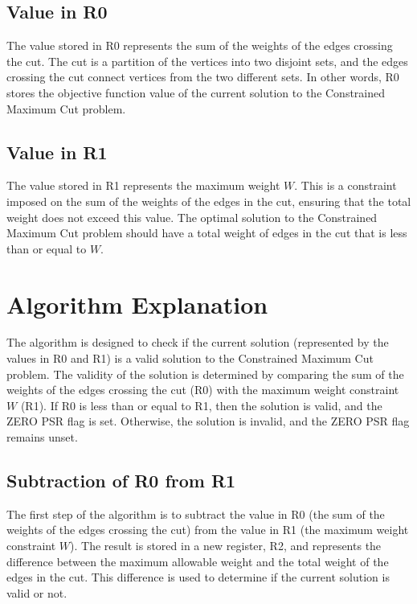 \subsection{Value in R0}

The value stored in R0 represents the sum of the weights of the edges crossing the cut. The cut is a partition of the vertices into two disjoint sets, and the edges crossing the cut connect vertices from the two different sets. In other words, R0 stores the objective function value of the current solution to the Constrained Maximum Cut problem.

\subsection{Value in R1}

The value stored in R1 represents the maximum weight $W$. This is a constraint imposed on the sum of the weights of the edges in the cut, ensuring that the total weight does not exceed this value. The optimal solution to the Constrained Maximum Cut problem should have a total weight of edges in the cut that is less than or equal to $W$.

\section{Algorithm Explanation}

The algorithm is designed to check if the current solution (represented by the values in R0 and R1) is a valid solution to the Constrained Maximum Cut problem. The validity of the solution is determined by comparing the sum of the weights of the edges crossing the cut (R0) with the maximum weight constraint $W$ (R1). If R0 is less than or equal to R1, then the solution is valid, and the ZERO PSR flag is set. Otherwise, the solution is invalid, and the ZERO PSR flag remains unset.

\subsection{Subtraction of R0 from R1}

The first step of the algorithm is to subtract the value in R0 (the sum of the weights of the edges crossing the cut) from the value in R1 (the maximum weight constraint $W$). The result is stored in a new register, R2, and represents the difference between the maximum allowable weight and the total weight of the edges in the cut. This difference is used to determine if the current solution is valid or not.

